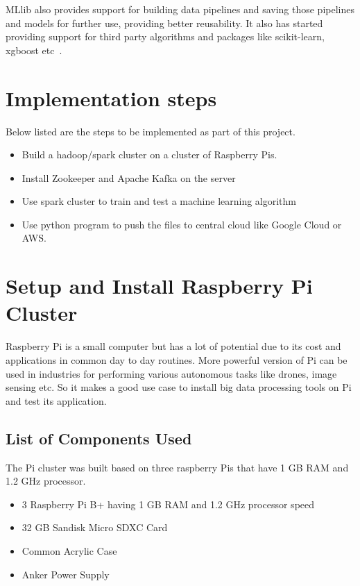 MLlib also provides support for building data pipelines and saving
those pipelines and models for further use, providing better
reusability. It also has started providing support for third party
algorithms and packages like scikit-learn, xgboost
etc~\cite{hid-sp18-510-mllib2}.

\section{Implementation steps}

Below listed are the steps to be implemented as part of this project.

\begin{itemize}
	\item Build a hadoop/spark cluster on a cluster of Raspberry Pis.
	\item Install Zookeeper and Apache Kafka on the server
	\item Use spark cluster to train and test a machine learning algorithm
	\item Use python program to push the files to central cloud like
    Google Cloud or AWS.
\end{itemize} 

\section{Setup and Install Raspberry Pi Cluster}

Raspberry Pi is a small computer but has a lot of potential due to its
cost and applications in common day to day routines. More powerful
version of Pi can be used in industries for performing various
autonomous tasks like drones, image sensing etc. So it makes a good
use case to install big data processing tools on Pi and test its
application.

\subsection{List of Components Used}

The Pi cluster was built based on three raspberry Pis that have 1 GB
RAM and 1.2 GHz processor.

\begin{itemize}
	\item 3 Raspberry Pi B+ having 1 GB RAM and 1.2 GHz processor speed
	\item 32 GB Sandisk Micro SDXC Card
	\item Common Acrylic Case
	\item Anker Power Supply
\end{itemize}

